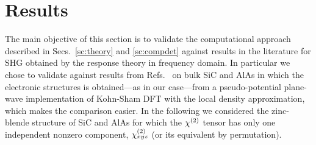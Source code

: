 \section{Results}\label{sc:results}
%                                                                                                                     
The main objective of this section is to validate the computational approach described in Secs.~\ref{sc:theory} and \ref{sc:compdet} against results in the literature for SHG obtained by the response theory in frequency domain. In particular we chose to validate against results from Refs.~\cite{PhysRevB.82.235201,PSSB.427.1984} on bulk SiC and AlAs in which the electronic structures is obtained---as in our case---from a pseudo-potential plane-wave implementation of Kohn-Sham DFT with the local density approximation, which makes the comparison easier.
In the following we considered the zinc-blende structure of SiC and AlAs for which the $\chi^{(2)}$ tensor has only one independent nonzero component, $\chi^{(2)}_{xyz}$ (or its equivalent by permutation).

